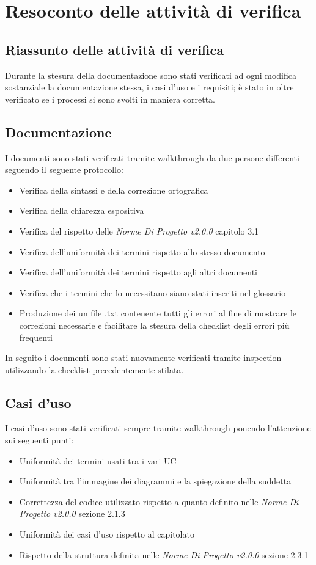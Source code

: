 \documentclass[a4paper]{article}
\begin{document}
				\section{Resoconto delle attività di verifica}
				\subsection{Riassunto delle attività di verifica}
			Durante la stesura della documentazione sono stati verificati ad ogni modifica sostanziale la documentazione stessa, i
			casi d'uso e i requisiti; è stato in oltre verificato se i processi si sono svolti in maniera corretta.
			\subsection{Documentazione}
				I documenti sono stati verificati tramite walkthrough da due persone differenti seguendo il seguente protocollo:
				\begin{itemize}
					\item Verifica della sintassi e della correzione ortografica
					\item Verifica della chiarezza espositiva
					\item Verifica del rispetto delle \emph{Norme Di Progetto v2.0.0} capitolo 3.1
					\item Verifica dell'uniformità dei termini rispetto allo stesso documento
					\item Verifica dell'uniformità dei termini rispetto agli altri documenti
					\item Verifica che i termini che lo necessitano siano stati inseriti nel glossario
					\item Produzione dei un file .txt contenente tutti gli errori al fine di mostrare le correzioni necessarie e
					facilitare la stesura della checklist degli errori più frequenti
				\end{itemize}
				In seguito i documenti sono stati nuovamente verificati tramite inspection utilizzando la checklist precedentemente
				stilata.
			
			\subsection{Casi d'uso}
				I casi d'uso sono stati verificati sempre tramite walkthrough ponendo l'attenzione sui seguenti punti:
				\begin{itemize}
					\item Uniformità dei termini usati tra i vari UC
					\item Uniformità tra l'immagine dei diagrammi e la spiegazione della suddetta
					\item Correttezza del codice utilizzato rispetto a quanto definito nelle \emph{Norme Di Progetto v2.0.0} sezione
					2.1.3
					\item Uniformità dei casi d'uso rispetto al capitolato
					\item Rispetto della struttura definita nelle \emph{Norme Di Progetto v2.0.0} sezione 2.3.1
				\end{itemize}
\end{document}
